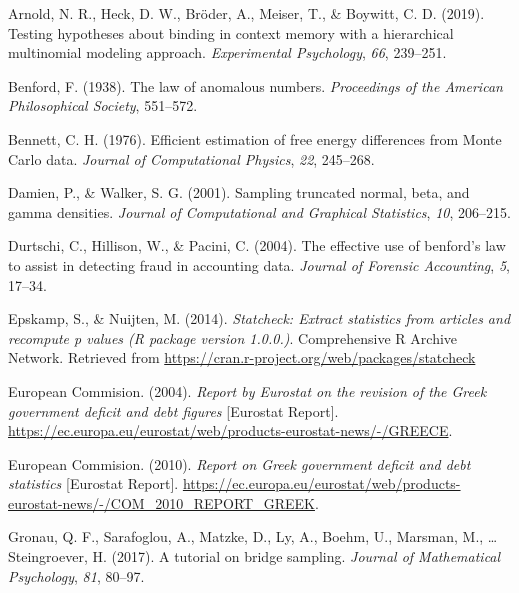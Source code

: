 \documentclass[
  english,
  man,floatsintext]{apa6}
\newlength{\cslhangindent}
\newenvironment{cslreferences}%
  {\setlength{\parindent}{0pt}%
  \everypar{\setlength{\hangindent}{\cslhangindent}}\ignorespaces}%
  {\par}
\begin{document}
\hypertarget{refs}{}
\begin{cslreferences}
\leavevmode\hypertarget{ref-arnold2019testing}{}%
Arnold, N. R., Heck, D. W., Bröder, A., Meiser, T., \& Boywitt, C. D. (2019). Testing hypotheses about binding in context memory with a hierarchical multinomial modeling approach. \emph{Experimental Psychology}, \emph{66}, 239--251.

\leavevmode\hypertarget{ref-benford1938law}{}%
Benford, F. (1938). The law of anomalous numbers. \emph{Proceedings of the American Philosophical Society}, 551--572.

\leavevmode\hypertarget{ref-bennett1976efficient}{}%
Bennett, C. H. (1976). Efficient estimation of free energy differences from Monte Carlo data. \emph{Journal of Computational Physics}, \emph{22}, 245--268.

\leavevmode\hypertarget{ref-damien2001sampling}{}%
Damien, P., \& Walker, S. G. (2001). Sampling truncated normal, beta, and gamma densities. \emph{Journal of Computational and Graphical Statistics}, \emph{10}, 206--215.

\leavevmode\hypertarget{ref-durtschi2004effective}{}%
Durtschi, C., Hillison, W., \& Pacini, C. (2004). The effective use of benford's law to assist in detecting fraud in accounting data. \emph{Journal of Forensic Accounting}, \emph{5}, 17--34.

\leavevmode\hypertarget{ref-epskamp2014statcheck}{}%
Epskamp, S., \& Nuijten, M. (2014). \emph{Statcheck: Extract statistics from articles and recompute p values (R package version 1.0.0.)}. Comprehensive R Archive Network. Retrieved from \url{https://cran.r-project.org/web/packages/statcheck}

\leavevmode\hypertarget{ref-europeanCommision2004}{}%
European Commision. (2004). \emph{Report by Eurostat on the revision of the Greek government deficit and debt figures} {[}Eurostat Report{]}. \url{https://ec.europa.eu/eurostat/web/products-eurostat-news/-/GREECE}.

\leavevmode\hypertarget{ref-europeanCommision2010}{}%
European Commision. (2010). \emph{Report on Greek government deficit and debt statistics} {[}Eurostat Report{]}. \url{https://ec.europa.eu/eurostat/web/products-eurostat-news/-/COM_2010_REPORT_GREEK}.

\leavevmode\hypertarget{ref-gronau2017tutorial}{}%
Gronau, Q. F., Sarafoglou, A., Matzke, D., Ly, A., Boehm, U., Marsman, M., \ldots{} Steingroever, H. (2017). A tutorial on bridge sampling. \emph{Journal of Mathematical Psychology}, \emph{81}, 80--97.


\end{cslreferences}
\end{document}
